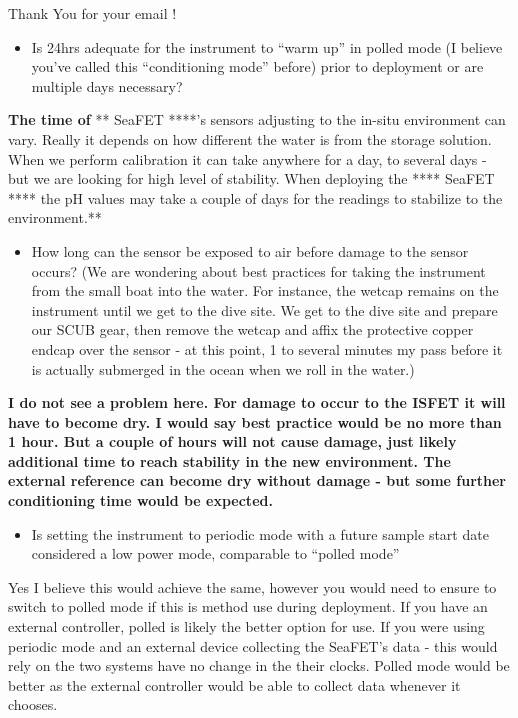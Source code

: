 \documentclass[]{book}
\providecommand{\tightlist}{%
  \setlength{\itemsep}{0pt}\setlength{\parskip}{0pt}}
\begin{document}
Thank You for your email !

\begin{itemize}
\tightlist
\item
  Is 24hrs adequate for the instrument to ``warm up'' in polled mode (I
  believe you've called this ``conditioning mode'' before) prior to
  deployment or are multiple days necessary?
\end{itemize}

\textbf{The time of }** SeaFET ****'s sensors adjusting to the in-situ
environment can vary. Really it depends on how different the water is
from the storage solution. When we perform calibration it can take
anywhere for a day, to several days - but we are looking for high level
of stability. When deploying the **** SeaFET **** the pH values may take
a couple of days for the readings to stabilize to the environment.**

\begin{itemize}
\tightlist
\item
  How long can the sensor be exposed to air before damage to the sensor
  occurs? (We are wondering about best practices for taking the
  instrument from the small boat into the water. For instance, the
  wetcap remains on the instrument until we get to the dive site. We get
  to the dive site and prepare our SCUB gear, then remove the wetcap and
  affix the protective copper endcap over the sensor - at this point, 1
  to several minutes my pass before it is actually submerged in the
  ocean when we roll in the water.)
\end{itemize}

\textbf{I do not see a problem here. For damage to occur to the ISFET it
will have to become dry. I would say best practice would be no more than
1 hour. But a couple of hours will not cause damage, just likely
additional time to reach stability in the new environment. The external
reference can become dry without damage - but some further conditioning
time would be expected.}

\begin{itemize}
\tightlist
\item
  Is setting the instrument to periodic mode with a future sample start
  date considered a low power mode, comparable to ``polled mode''
\end{itemize}

Yes I believe this would achieve the same, however you would need to
ensure to switch to polled mode if this is method use during deployment.
If you have an external controller, polled is likely the better option
for use. If you were using periodic mode and an external device
collecting the SeaFET's data - this would rely on the two systems have
no change in the their clocks. Polled mode would be better as the
external controller would be able to collect data whenever it chooses.
\end{document}
